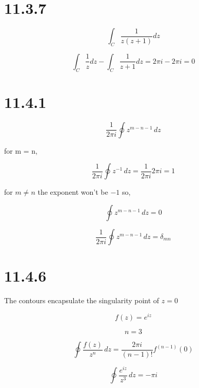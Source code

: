\documentclass[12pt]{article}
\begin{document}
\newpage
\section{11.3.7}

\[
    \int_C \frac{1}{z(z+1)}dz
\]

\[
    \int_C \frac{1}{z} dz - \int_C \frac{1}{z+1} dz = 2 \pi i - 2 \pi i = 0
\]

\newpage
\section{11.4.1}

\[
    \frac{1}{2\pi i}\oint z^{m-n-1} \, dz
\]

for m = n,

\[
    \frac{1}{2\pi i}\oint z^{-1} \, dz = \frac{1}{2\pi i} 2\pi i = 1
\]

for $m \neq n$ the exponent won't be $-1$ so,

\[
    \oint z^{m-n-1} \, dz = 0
\]

\[
    \frac{1}{2\pi i}\oint z^{m-n-1} \, dz = \delta_{mn}
\]

\newpage
\section{11.4.6}

The contours encapsulate the singularity point of $z=0$

\[
    f(z) = e^{iz}
\]

\[
    n = 3
\]

\[
    \oint \frac{f(z)}{z^n} \, dz = \frac{2 \pi i}{(n-1)!}f^{(n-1)}(0)
\]

\[
    \oint \frac{e^{iz}}{z^3} \, dz = -\pi i
\]

\newpage



\nocite{arfken2013mathematical}
\nocite{El-Deeb_PEU-455_Assignments}
\end{document}
